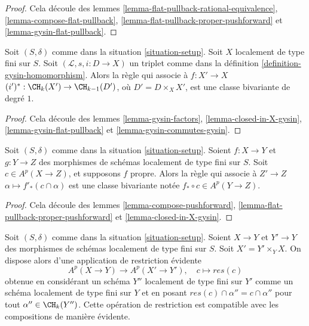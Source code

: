 \begin{proof}
Cela découle des
lemmes \ref{lemma-flat-pullback-rational-equivalence},
\ref{lemma-compose-flat-pullback},
\ref{lemma-flat-pullback-proper-pushforward} et
\ref{lemma-gysin-flat-pullback}.
\end{proof}

\begin{lemma}
\label{lemma-gysin-bivariant}
Soit $(S, \delta)$ comme dans la situation \ref{situation-setup}.
Soit $X$ localement de type fini sur $S$.
Soit $(\mathcal{L}, s, i : D \to X)$ un triplet comme dans la
définition \ref{definition-gysin-homomorphism}.
Alors la règle qui associe à $f : X' \to X$
$(i')^* : \CH_k(X') \to \CH_{k - 1}(D')$, où $D' = D \times_X X'$,
est une classe bivariante de degré $1$.
\end{lemma}

\begin{proof}
Cela découle des lemmes \ref{lemma-gysin-factors},
\ref{lemma-closed-in-X-gysin},
\ref{lemma-gysin-flat-pullback} et
\ref{lemma-gysin-commutes-gysin}.
\end{proof}

\begin{lemma}
\label{lemma-push-proper-bivariant}
Soit $(S, \delta)$ comme dans la situation \ref{situation-setup}.
Soient $f : X \to Y$ et $g : Y \to Z$ des morphismes de
schémas localement de type fini sur $S$.
Soit $c \in A^p(X \to Z)$, et supposons $f$ propre.
Alors la règle qui associe à $Z' \to Z$
$\alpha \longmapsto f'_*(c \cap \alpha)$
est une classe bivariante notée $f_* \circ c \in A^p(Y \to Z)$.
\end{lemma}

\begin{proof}
Cela découle des lemmes \ref{lemma-compose-pushforward},
\ref{lemma-flat-pullback-proper-pushforward} et
\ref{lemma-closed-in-X-gysin}.
\end{proof}

\begin{remark}
\label{remark-restriction-bivariant}
Soit $(S, \delta)$ comme dans la situation \ref{situation-setup}. Soient $X \to Y$
et $Y' \to Y$ des morphismes de schémas localement de type fini sur $S$.
Soit $X' = Y' \times_Y X$. On dispose alors d'une application de restriction évidente
$$
A^p(X \to Y) \longrightarrow A^p(X' \to Y'),\quad
c \longmapsto res(c)
$$
obtenue en considérant un schéma $Y''$ localement de type fini sur $Y'$
comme un schéma localement de type fini sur $Y$ et en posant
$res(c) \cap \alpha'' = c \cap \alpha''$ pour tout $\alpha'' \in \CH_k(Y'')$.
Cette opération de restriction est compatible avec les compositions de manière
évidente.
\end{remark}

